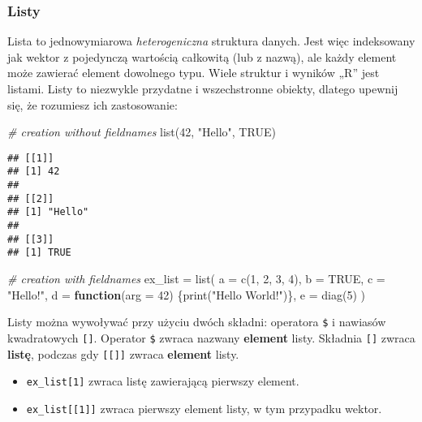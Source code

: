 \documentclass[
]{article}
\newenvironment{Shaded}{\begin{snugshade}}{\end{snugshade}}
\newcommand{\AttributeTok}[1]{\textcolor[rgb]{0.77,0.63,0.00}{#1}}
\newcommand{\CommentTok}[1]{\textcolor[rgb]{0.56,0.35,0.01}{\textit{#1}}}
\newcommand{\ConstantTok}[1]{\textcolor[rgb]{0.00,0.00,0.00}{#1}}
\newcommand{\ControlFlowTok}[1]{\textcolor[rgb]{0.13,0.29,0.53}{\textbf{#1}}}
\newcommand{\DecValTok}[1]{\textcolor[rgb]{0.00,0.00,0.81}{#1}}
\newcommand{\FunctionTok}[1]{\textcolor[rgb]{0.00,0.00,0.00}{#1}}
\newcommand{\NormalTok}[1]{#1}
\newcommand{\OtherTok}[1]{\textcolor[rgb]{0.56,0.35,0.01}{#1}}
\newcommand{\StringTok}[1]{\textcolor[rgb]{0.31,0.60,0.02}{#1}}
\providecommand{\tightlist}{%
  \setlength{\itemsep}{0pt}\setlength{\parskip}{0pt}}
\begin{document}
\hypertarget{listy}{%
\subsubsection{Listy}\label{listy}}

Lista to jednowymiarowa \emph{heterogeniczna} struktura danych. Jest
więc indeksowany jak wektor z pojedynczą wartością całkowitą (lub z
nazwą), ale każdy element może zawierać element dowolnego typu. Wiele
struktur i wyników „R'' jest listami. Listy to niezwykle przydatne i
wszechstronne obiekty, dlatego upewnij się, że rozumiesz ich
zastosowanie:

\begin{Shaded}
\begin{Highlighting}[]
\CommentTok{\# creation without fieldnames}
\FunctionTok{list}\NormalTok{(}\DecValTok{42}\NormalTok{, }\StringTok{"Hello"}\NormalTok{, }\ConstantTok{TRUE}\NormalTok{)}
\end{Highlighting}
\end{Shaded}

\begin{verbatim}
## [[1]]
## [1] 42
## 
## [[2]]
## [1] "Hello"
## 
## [[3]]
## [1] TRUE
\end{verbatim}

\begin{Shaded}
\begin{Highlighting}[]
\CommentTok{\# creation with fieldnames}
\NormalTok{ex\_list }\OtherTok{=} \FunctionTok{list}\NormalTok{(}
  \AttributeTok{a =} \FunctionTok{c}\NormalTok{(}\DecValTok{1}\NormalTok{, }\DecValTok{2}\NormalTok{, }\DecValTok{3}\NormalTok{, }\DecValTok{4}\NormalTok{),}
  \AttributeTok{b =} \ConstantTok{TRUE}\NormalTok{,}
  \AttributeTok{c =} \StringTok{"Hello!"}\NormalTok{,}
  \AttributeTok{d =} \ControlFlowTok{function}\NormalTok{(}\AttributeTok{arg =} \DecValTok{42}\NormalTok{) \{}\FunctionTok{print}\NormalTok{(}\StringTok{"Hello World!"}\NormalTok{)\},}
  \AttributeTok{e =} \FunctionTok{diag}\NormalTok{(}\DecValTok{5}\NormalTok{)}
\NormalTok{)}
\end{Highlighting}
\end{Shaded}

Listy można wywoływać przy użyciu dwóch składni: operatora \texttt{\$} i
nawiasów kwadratowych \texttt{{[}{]}}. Operator \texttt{\$} zwraca
nazwany \textbf{element} listy. Składnia \texttt{{[}{]}} zwraca
\textbf{listę}, podczas gdy \texttt{{[}{[}{]}{]}} zwraca
\textbf{element} listy.

\begin{itemize}
\tightlist
\item
  \texttt{ex\_list{[}1{]}} zwraca listę zawierającą pierwszy element.
\item
  \texttt{ex\_list{[}{[}1{]}{]}} zwraca pierwszy element listy, w tym
  przypadku wektor.
\end{itemize}
\end{document}

